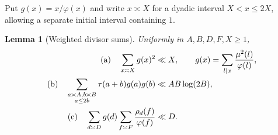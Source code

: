 \documentclass[10pt,reqno]{amsart}
\newtheorem{lemma}[theorem]{Lemma}
\theoremstyle{definition}
\numberwithin{equation}{section}
\begin{document}
Put $g(x)=x/\varphi(x)$ and write $x\asymp X$ for a dyadic interval
$X<x\le2X$, allowing a separate initial interval containing $1$.
\begin{lemma}[Weighted divisor sums]\label{L:8.3}
Uniformly in $A,B,D,F,X\ge1$,
\begin{align}
 \textup{(a)}\quad\sum_{x\asymp X}g(x)^2&\ll X,\qquad
             g(x)=\sum_{l\mid x}\frac{\mu^2(l)}{\varphi(l)},\label{A:eq:gmean}\\
 \textup{(b)}\quad\sum_{\substack{a\asymp A,b\asymp B\\a\le2b}}
          \tau(a+b)g(a)g(b)&\ll AB\log(2B),\label{A:eq:abmass}\\
 \textup{(c)}\quad\sum_{d\asymp D}g(d)\sum_{f\asymp F}\frac{\rho_d(f)}{\varphi(f)}&\ll D.
                                                        \label{A:eq:rootmass}
\end{align}
\end{lemma}
\end{document}
